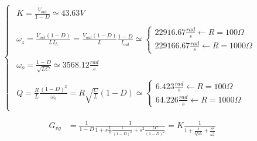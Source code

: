 \documentclass{article}
\begin{document}
\vspace{0.5em}
\[
\begin{cases}
    \begin{aligned}
       K = \frac{V_{out}}{1-D} \simeq 43.63 V
    \end{aligned}
       \\[2em]
    \begin{aligned}
       \omega_z = \frac{V_{out}(1-D)}{LI_L} = \frac{V_{out}(1-D)}{L}\frac{1-D}{I_{out}} \simeq 
        \begin{cases}
            22916.67 \frac{rad}{s} \xleftarrow{} R = 100 \Omega\\
            229166.67 \frac{rad}{s} \xleftarrow{} R = 1000 \Omega
        \end{cases}
    \end{aligned}
       \\[2em]
    \begin{aligned}
       \omega_o = \frac{1-D}{\sqrt{LC}} \simeq 3568.12 \frac{rad}{s}
    \end{aligned}
       \\[2em]
    \begin{aligned}
       Q = \frac{R}{L} \frac{(1-D)^2}{\omega_o} = R \sqrt{\frac{C}{L}} (1-D) \simeq 
        \begin{cases}
            6.423 \frac{rad}{s} \xleftarrow{} R = 100 \Omega \\
            64.226 \frac{rad}{s} \xleftarrow{} R = 1000 \Omega
        \end{cases}
    \end{aligned}  
\end{cases}
\]
\vspace{0.5em}

\vspace{0.5em}
\begin{align*}
    G_{vg} &= \frac{1}{1-D} \frac{1}{1 + s \frac{L}{R}\frac{1}{(1-D)^2} + s^2 \frac{LC}{(1-D)^2}} = K \frac{1}{1+\frac{s}{Q \omega_o} + \frac{s^2}{\omega_o^2}}
\end{align*}
\vspace{0.5em}
\end{document}
